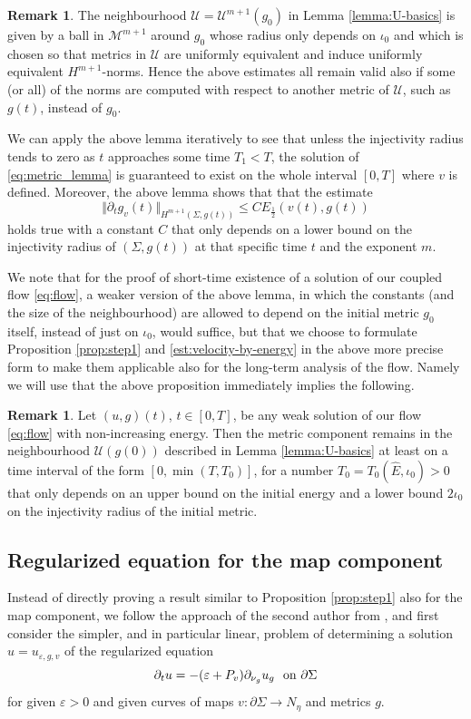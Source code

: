 \documentclass[10pt,reqno]{amsart}
\theoremstyle{plain}
\theoremstyle{definition}
\newtheorem{rmk}[lemma]{Remark}
\numberwithin{equation}{section}
\newcommand{\Si}{\Sigma}
\newcommand{\ep}{\varepsilon}
\newcommand{\norm}[1]{\Vert#1\Vert}
\newcommand{\beq}{\begin{equation}}
\newcommand{\eeq}{\end{equation}}
\newcommand{\half}{\frac{1}{2}}
\newcommand{\pt}{\partial_t}
\newcommand{\Eh}{E_{\half}} %
\newcommand{\pSi}{{\partial \Sigma}}
\newcommand{\MM}{\mathcal{M}} %
\newcommand{\UU}{{\mathcal U}}
\newcommand{\p}{\partial} %
\begin{document}
\begin{rmk}\label{rmk:def_UU}
	The neighbourhood $\UU=\UU^{m+1}(g_0)$ in Lemma \ref{lemma:U-basics} is given by a ball in $\MM^{m+1}$ around $g_0$ whose radius only depends on $\iota_0$ and which is chosen so that metrics in $\UU$ are uniformly equivalent and induce uniformly equivalent $H^{m+1}$-norms. Hence the above estimates all remain valid also if some (or all) of the norms are computed with respect to another metric of $\UU$, such as $g(t)$, instead of $g_0$. 
	
	We can apply the above lemma iteratively to see that unless the injectivity radius tends to zero as $t$ approaches some time $T_1<T$,  the solution of \eqref{eq:metric_lemma} is guaranteed to exist on the whole interval $[0,T]$ where $v$ is defined. Moreover, the above lemma shows that  that the estimate
	\beq\label{est:velocity-by-energy}
        \norm{\pt g_v(t)}_{H^{m+1}(\Si,g(t))}\leq C \Eh(v(t),g(t)) 
	\eeq   
	holds true with a constant $C$ that only depends on a lower bound on the injectivity radius of $(\Si,g(t))$ at that specific time $t$ and the exponent $m$.
\end{rmk}
We note that for the proof of short-time existence of a solution of our coupled flow \eqref{eq:flow}, a weaker version of the above lemma, in which the constants (and the size of the neighbourhood) are allowed to depend on the initial metric $g_0$ itself, instead of just on $\iota_0$, would suffice, but that we choose to formulate Proposition \ref{prop:step1} and \eqref{est:velocity-by-energy} in the above more precise form to make them applicable also for the long-term analysis of the flow. Namely we will use that the above proposition immediately implies the following. 

\begin{rmk}\label{rmk:uniform_metric_time}
    Let $(u,g)(t)$, $t\in [0,T]$, be any weak solution of our flow \eqref{eq:flow} with non-increasing energy. Then the metric component remains in the neighbourhood $\UU(g(0))$ described in Lemma \ref{lemma:U-basics} at least on  a time interval of the form $[0,\min(T,T_0)]$, for a number $T_0=T_0(\hat E,\iota_0)>0$ that only depends on an upper bound on the initial energy and a lower bound $2\iota_0$ on the injectivity radius of the initial metric.  
\end{rmk}

\subsection{Regularized equation for the map component}
Instead of directly proving a result similar to Proposition \ref{prop:step1} also for the map component, we follow the approach of the second author from \cite[Lemma 5.2]{S}, and first consider the simpler, and in particular linear, problem of determining a solution $u=u_{\ep,g,v}$ of the regularized equation 
\begin{equation}\label{eq:ep_v_map}
	\p_t u = -(\ep + P_{v})\p_{\nu_{g}}u_{g}\ \hbox{ on }\pSi
\end{equation}
for given $\ep>0$ and given curves of maps $v:\pSi\to N_\eta$ and metrics $g$. 
\end{document}
